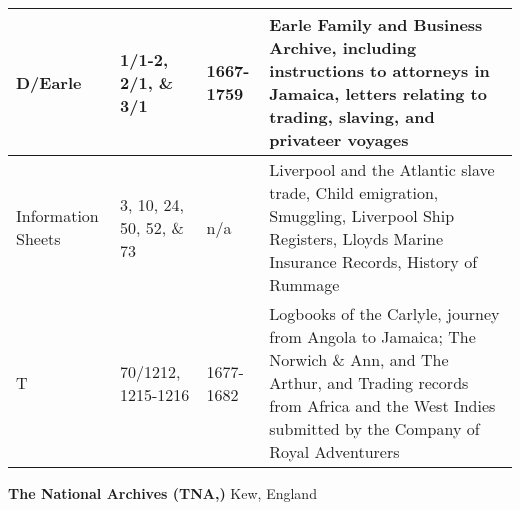 \begin{flushleft}
\begin{supertabular}{|m{0.86635983in}|m{1.4830599in}|m{0.8830598in}|m{2.4636598in}|}
D/Earle &
1/1-2, 2/1, \& 3/1 &
1667-1759 &
Earle Family and Business Archive, including instructions to attorneys in Jamaica, letters relating to trading, slaving, and privateer voyages \\\hline
Information Sheets &
3, 10, 24, 50, 52, \& 73 &
n/a &
Liverpool and the Atlantic slave trade, Child emigration, Smuggling, Liverpool Ship Registers, Lloyds Marine Insurance Records, History of Rummage\\\hline
T &
70/1212, 1215-1216 &
1677-1682 &
Logbooks of the Carlyle, journey from Angola to Jamaica; The Norwich \& Ann, and The Arthur, and Trading records from Africa and the West Indies submitted by the Company of Royal Adventurers\\\hline
\end{supertabular}
\end{flushleft}
\begin{styleStandard}
\textbf{The National Archives (TNA,)} Kew, England
\end{styleStandard}

